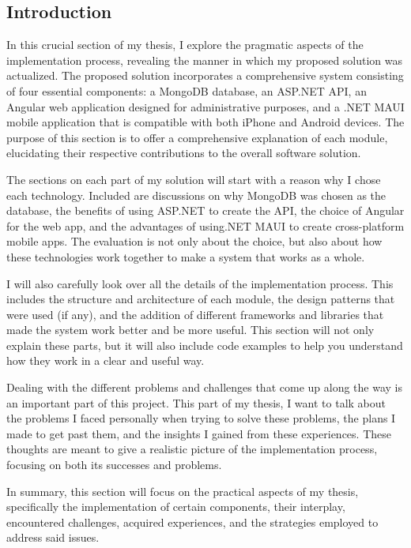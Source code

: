 \subsection{Introduction}

In this crucial section of my thesis, I explore the pragmatic aspects of the implementation process, revealing the manner in which my proposed solution was actualized. The proposed solution incorporates a comprehensive system consisting of four essential components: a MongoDB database, an ASP.NET API, an Angular web application designed for administrative purposes, and a .NET MAUI mobile application that is compatible with both iPhone and Android devices. The purpose of this section is to offer a comprehensive explanation of each module, elucidating their respective contributions to the overall software solution.

The sections on each part of my solution will start with a reason why I chose each technology. Included are discussions on why MongoDB was chosen as the database, the benefits of using ASP.NET to create the API, the choice of Angular for the web app, and the advantages of using.NET MAUI to create cross-platform mobile apps. The evaluation is not only about the choice, but also about how these technologies work together to make a system that works as a whole.

I will also carefully look over all the details of the implementation process. This includes the structure and architecture of each module, the design patterns that were used (if any), and the addition of different frameworks and libraries that made the system work better and be more useful. This section will not only explain these parts, but it will also include code examples to help you understand how they work in a clear and useful way.

Dealing with the different problems and challenges that come up along the way is an important part of this project. This part of my thesis, I want to talk about the problems I faced personally when trying to solve these problems, the plans I made to get past them, and the insights I gained from these experiences. These thoughts are meant to give a realistic picture of the implementation process, focusing on both its successes and problems.

In summary, this section will focus on the practical aspects of my thesis, specifically the implementation of certain components, their interplay, encountered challenges, acquired experiences, and the strategies employed to address said issues.

